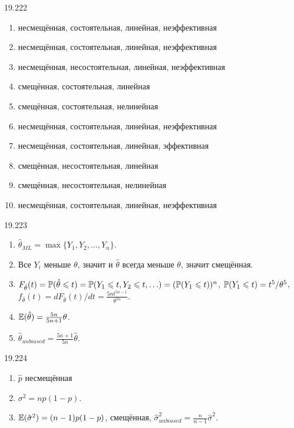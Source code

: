 \protect \hypertarget {soln:19.222}{}
\begin{solution}{{19.222}}
    \begin{enumerate}
    \item несмещённая, состоятельная, линейная, неэффективная
    \item несмещённая, состоятельная, линейная, неэффективная
    \item несмещённая, несостоятельная, линейная, неэффективная
    \item смещённая, состоятельная, линейная
    \item смещённая, состоятельная, нелинейная
    \item несмещённая, состоятельная, линейная, неэффективная
    \item несмещённая, состоятельная, линейная, эффективная
    \item смещённая, несостоятельная, линейная
    \item смещённая, несостоятельная, нелинейная
    \item несмещённая, состоятельная, линейная, неэффективная
    \end{enumerate}
  
\end{solution}
\protect \hypertarget {soln:19.223}{}
\begin{solution}{{19.223}}
\begin{enumerate}
\item $\hat\theta_{ML} = \max\{ Y_1, Y_2, \ldots, Y_n\}$.
\item Все $Y_i$ меньше $\theta$, значит и $\hat\theta$ всегда меньше $\theta$, значит смещённая.
\item $F_{\hat\theta}(t) = \P(\hat\theta \leq t) = \P(Y_1 \leq t, Y_2 \leq t, \ldots) = (\P(Y_1 \leq t))^n$, $\P(Y_1 \leq t) = t^5/\theta^5$, $f_{\hat\theta}(t) = dF_{\hat\theta}(t)/dt = \frac{5n t^{5n-1}}{\theta^{5n}}$.
\item $\E(\hat\theta) = \frac{5n}{5n+1}\theta$.
\item $\hat\theta_{unbiased} = \frac{5n+1}{5n}\hat\theta$.
\end{enumerate}
\end{solution}
\protect \hypertarget {soln:19.224}{}
\begin{solution}{{19.224}}
\begin{enumerate}
  \item $\hat p$ несмещённая
  \item $\sigma^2 = n p(1-p)$.
  \item $\E(\hat\sigma^2) = (n-1)p(1-p)$, смещённая, $\hat\sigma^2_{unbiased} = \frac{n}{n-1} \hat\sigma^2$.
\end{enumerate}
\end{solution}
